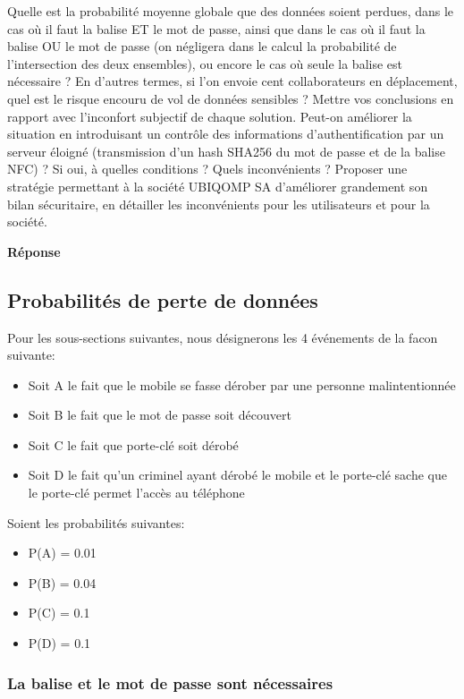 \documentclass[francais,12pt]{article}
\begin{document}
	 Quelle est la probabilité moyenne globale que des données soient perdues, dans le cas où il faut la balise ET le mot de passe, ainsi que dans le cas où il faut la balise OU le mot de passe (on négligera dans le calcul la probabilité de l’intersection des deux ensembles), ou encore le cas où seule la balise est nécessaire ? En d'autres termes, si l'on envoie cent collaborateurs en déplacement, quel est le risque encouru de vol de données sensibles ? Mettre vos conclusions en rapport avec l'inconfort subjectif de chaque solution. Peut-on améliorer la situation en introduisant un contrôle des informations d'authentification par un serveur éloigné (transmission d'un hash SHA256 du mot de passe et de la balise NFC) ? Si oui, à quelles conditions ? Quels inconvénients ? Proposer une stratégie permettant à la société UBIQOMP SA d'améliorer grandement son bilan sécuritaire, en détailler les inconvénients pour les utilisateurs et pour la société. 
	 
	 {\color[rgb]{0,0.5,0.23}\textbf{Réponse}}
	 
	 \subsection*{Probabilités de perte de données}
	 Pour les sous-sections suivantes, nous désignerons les 4 événements de la facon suivante: 
	 
	 \begin{itemize}
	 	\item Soit A le fait que le mobile se fasse dérober par une personne malintentionnée
	 	\item Soit B le fait que le mot de passe soit découvert
	 	\item Soit C le fait que porte-clé soit dérobé
	 	\item Soit D le fait qu'un criminel ayant dérobé le mobile et le porte-clé sache que le porte-clé permet l'accès au téléphone
	 \end{itemize}
 
 	Soient les probabilités suivantes:
  	\begin{itemize}
  		\item P(A) = 0.01
  		\item P(B) = 0.04
  		\item P(C) = 0.1
  		\item P(D) = 0.1
  	\end{itemize}
	 
	 \subsubsection*{La balise et le mot de passe sont nécessaires}
	 
\end{document}
